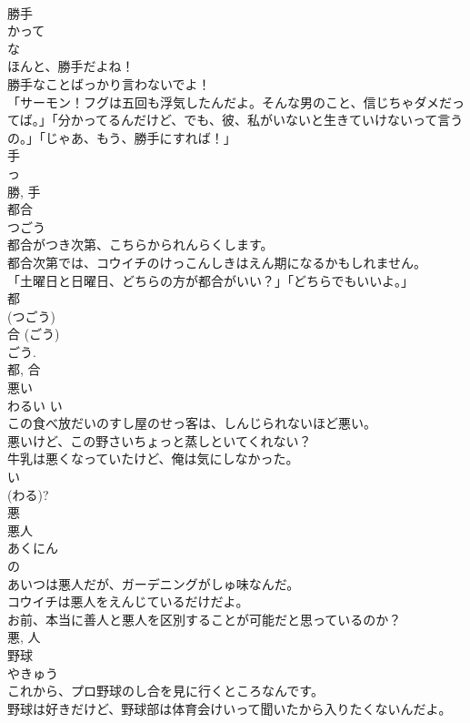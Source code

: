 \documentclass[8pt]{extreport}
\begin{document}
\begin{CJK}{UTF8}{min}
\\	勝手	
\\	かって	
\\	な 
\\	ほんと、勝手だよね！	
\\	勝手なことばっかり言わないでよ！	
\\	「サーモン！フグは五回も浮気したんだよ。そんな男のこと、信じちゃダメだってば。」「分かってるんだけど、でも、彼、私がいないと生きていけないって言うの。」「じゃあ、もう、勝手にすれば！」	
\\	手 
\\	っ 
\\	勝, 手	
\\	都合	
\\	つごう	
\\	都合がつき次第、こちらかられんらくします。	
\\	都合次第では、コウイチのけっこんしきはえん期になるかもしれません。	
\\	「土曜日と日曜日、どちらの方が都合がいい？」「どちらでもいいよ。」	
\\	都 
\\	(つごう) 
\\	合 (ごう) 
\\	ごう.
\\	都, 合	
\\	悪い	
\\	わるい	い 
\\	この食べ放だいのすし屋のせっ客は、しんじられないほど悪い。	
\\	悪いけど、この野さいちょっと蒸しといてくれない？	
\\	牛乳は悪くなっていたけど、俺は気にしなかった。	
\\	い 
\\	(わる)? 
\\	悪	
\\	悪人	
\\	あくにん	
\\	の 
\\	あいつは悪人だが、ガーデニングがしゅ味なんだ。	
\\	コウイチは悪人をえんじているだけだよ。	
\\	お前、本当に善人と悪人を区別することが可能だと思っているのか？	
\\	悪, 人	
\\	野球	
\\	やきゅう	
\\	これから、プロ野球のし合を見に行くところなんです。	
\\	野球は好きだけど、野球部は体育会けいって聞いたから入りたくないんだよ。	

\end{CJK}
\end{document}
